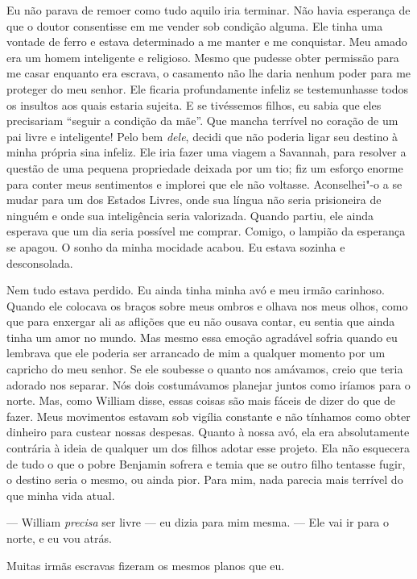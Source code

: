 Eu não parava de remoer como tudo
aquilo iria terminar. Não havia esperança de que o doutor consentisse em
me vender sob condição alguma. Ele tinha uma vontade de ferro e estava
determinado a me manter e me conquistar. Meu amado era um homem
inteligente e religioso. Mesmo que pudesse obter permissão para me casar
enquanto era escrava, o casamento não lhe daria nenhum poder para me
proteger do meu senhor. Ele ficaria profundamente infeliz se
testemunhasse todos os insultos aos quais estaria sujeita. E se
tivéssemos filhos, eu sabia que eles precisariam ``seguir a condição da
mãe''. Que mancha terrível no coração de um pai livre e inteligente!
Pelo bem \emph{dele}, decidi que não poderia ligar seu destino à minha
própria sina infeliz. Ele iria fazer uma viagem a Savannah, para
resolver a questão de uma pequena propriedade deixada por um tio; fiz um
esforço enorme para conter meus sentimentos e implorei que ele não
voltasse. Aconselhei"-o a se mudar para um dos Estados Livres, onde sua
língua não seria prisioneira de ninguém e onde sua inteligência seria
valorizada. Quando partiu, ele ainda esperava que um dia seria possível
me comprar. Comigo, o lampião da esperança se apagou. O sonho da minha
mocidade acabou. Eu estava sozinha e desconsolada.

Nem tudo estava perdido. Eu ainda tinha
minha avó e meu irmão carinhoso. Quando ele colocava os braços sobre
meus ombros e olhava nos meus olhos, como que para enxergar ali as
aflições que eu não ousava contar, eu sentia que ainda tinha um amor no
mundo. Mas mesmo essa emoção agradável sofria quando eu lembrava que ele
poderia ser arrancado de mim a qualquer momento por um capricho do meu
senhor. Se ele soubesse o quanto nos amávamos, creio que teria adorado
nos separar. Nós dois costumávamos planejar juntos como iríamos para o
norte. Mas, como William disse, essas coisas são mais fáceis de dizer do
que de fazer. Meus movimentos estavam sob vigília constante e não
tínhamos como obter dinheiro para custear nossas despesas. Quanto à
nossa avó, ela era absolutamente contrária à ideia de qualquer um dos
filhos adotar esse projeto. Ela não esquecera de tudo o que o pobre
Benjamin sofrera e temia que se outro filho tentasse fugir, o destino
seria o mesmo, ou ainda pior. Para mim, nada parecia mais terrível do
que minha vida atual.

--- William \emph{precisa} ser livre --- eu dizia para mim mesma. ---
Ele vai ir para o norte, e eu vou atrás.

Muitas irmãs escravas fizeram os mesmos planos que eu.

